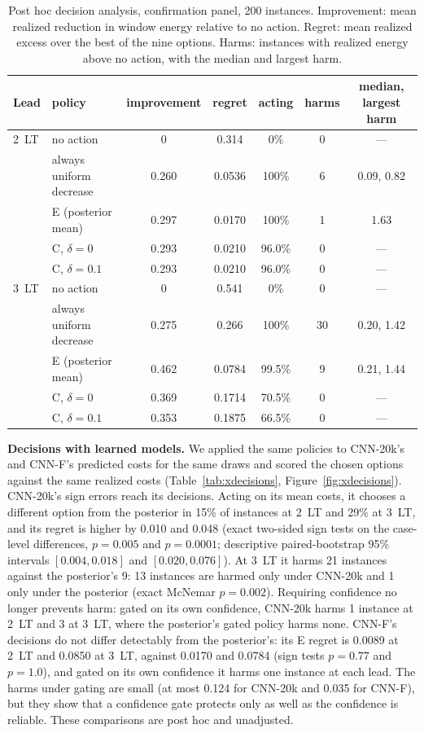\documentclass[11pt]{article}
\begin{document}
\begin{table}[t]
\centering
\small
\caption{Post hoc decision analysis, confirmation panel, 200 instances. Improvement: mean realized reduction in window energy relative to no action. Regret: mean realized excess over the best of the nine options. Harms: instances with realized energy above no action, with the median and largest harm.}
\label{tab:decisions}
\begin{tabular}{llccccc}
\toprule
Lead & policy & improvement & regret & acting & harms & median, largest harm \\
\midrule
2~LT & no action & 0 & 0.314 & 0\% & 0 & --- \\
     & always uniform decrease & 0.260 & 0.0536 & 100\% & 6 & 0.09, 0.82 \\
     & E (posterior mean) & 0.297 & 0.0170 & 100\% & 1 & 1.63 \\
     & C, $\delta = 0$ & 0.293 & 0.0210 & 96.0\% & 0 & --- \\
     & C, $\delta = 0.1$ & 0.293 & 0.0210 & 96.0\% & 0 & --- \\
\midrule
3~LT & no action & 0 & 0.541 & 0\% & 0 & --- \\
     & always uniform decrease & 0.275 & 0.266 & 100\% & 30 & 0.20, 1.42 \\
     & E (posterior mean) & 0.462 & 0.0784 & 99.5\% & 9 & 0.21, 1.44 \\
     & C, $\delta = 0$ & 0.369 & 0.1714 & 70.5\% & 0 & --- \\
     & C, $\delta = 0.1$ & 0.353 & 0.1875 & 66.5\% & 0 & --- \\
\bottomrule
\end{tabular}
\end{table}

\textbf{Decisions with learned models.} We applied the same policies to CNN-20k's and CNN-F's predicted costs for the same draws and scored the chosen options against the same realized costs (Table~\ref{tab:xdecisions}, Figure~\ref{fig:xdecisions}). CNN-20k's sign errors reach its decisions. Acting on its mean costs, it chooses a different option from the posterior in 15\% of instances at 2~LT and 29\% at 3~LT, and its regret is higher by 0.010 and 0.048 (exact two-sided sign tests on the case-level differences, $p = 0.005$ and $p = 0.0001$; descriptive paired-bootstrap 95\% intervals $[0.004, 0.018]$ and $[0.020, 0.076]$). At 3~LT it harms 21 instances against the posterior's 9: 13 instances are harmed only under CNN-20k and 1 only under the posterior (exact McNemar $p = 0.002$). Requiring confidence no longer prevents harm: gated on its own confidence, CNN-20k harms 1 instance at 2~LT and 3 at 3~LT, where the posterior's gated policy harms none. CNN-F's decisions do not differ detectably from the posterior's: its E regret is 0.0089 at 2~LT and 0.0850 at 3~LT, against 0.0170 and 0.0784 (sign tests $p = 0.77$ and $p = 1.0$), and gated on its own confidence it harms one instance at each lead. The harms under gating are small (at most 0.124 for CNN-20k and 0.035 for CNN-F), but they show that a confidence gate protects only as well as the confidence is reliable. These comparisons are post hoc and unadjusted.
\end{document}
